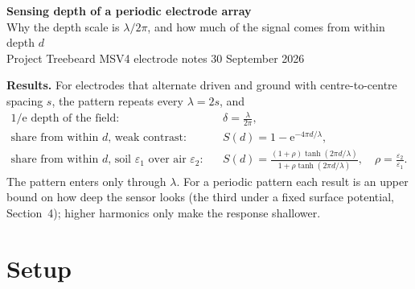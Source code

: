 \documentclass[11pt,letterpaper]{article}
\newcommand{\e}{\mathrm{e}}
\begin{document}
\begin{center}
{\LARGE\bfseries Sensing depth of a periodic electrode array}\\[6pt]
{\large Why the depth scale is $\lambda/2\pi$, and how much of the signal comes from within depth $d$}\\[8pt]
{\small\color{inkgray}Project Treebeard \textperiodcentered{} MSV4 electrode notes \textperiodcentered{} 30 September 2026}
\end{center}

\vspace{4pt}
\begin{tcolorbox}[colback=gray!4,colframe=gray!45,boxrule=0.5pt,arc=2pt,left=10pt,right=10pt,top=6pt,bottom=6pt]
\textbf{Results.} For electrodes that alternate driven and ground with centre-to-centre spacing $s$, the
pattern repeats every $\lambda = 2s$, and
\begin{align*}
  \text{1/e depth of the field:}\qquad & \delta = \frac{\lambda}{2\pi}, \\[2pt]
  \text{share from within } d\text{, weak contrast:}\qquad & S(d) = 1-\e^{-4\pi d/\lambda}, \\[2pt]
  \text{share from within } d\text{, soil } \varepsilon_1 \text{ over air } \varepsilon_2\text{:}\qquad &
  S(d) = \frac{(1+\rho)\tanh(2\pi d/\lambda)}{1+\rho\tanh(2\pi d/\lambda)}, \quad \rho = \frac{\varepsilon_2}{\varepsilon_1}.
\end{align*}
The pattern enters only through $\lambda$. For a periodic pattern each result is an upper bound on how deep
the sensor looks (the third under a fixed surface potential, Section~4); higher harmonics only make the
response shallower.
\end{tcolorbox}

\section{Setup}
\end{document}
